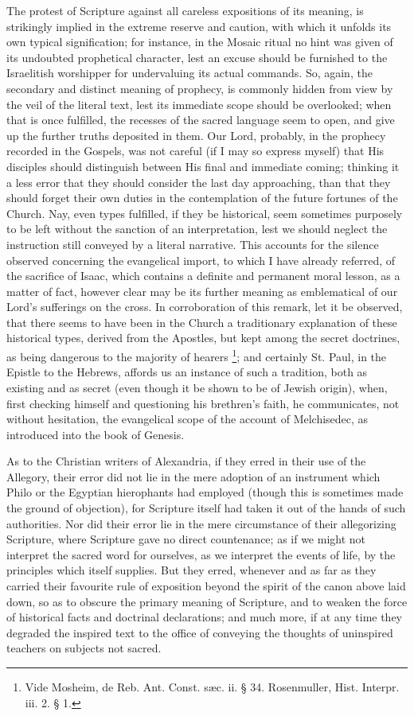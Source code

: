 The protest of Scripture against all careless expositions of its
meaning, is strikingly implied in the extreme reserve and caution,
with which it unfolds its own typical signification; for instance, in
the Mosaic ritual no hint was given of its undoubted prophetical
character, lest an excuse should be furnished to the Israelitish
worshipper for undervaluing its actual commands. So, again, the
secondary and distinct meaning of prophecy, is commonly hidden from
view by the veil of the literal text, lest its immediate scope should
be overlooked; when that is once fulfilled, the recesses of the sacred
language seem to open, and give up the further truths deposited in
them. Our Lord, probably, in the prophecy recorded in the Gospels, was
not careful (if I may so express myself) that His disciples should
distinguish between His final and immediate coming; thinking it a less
error that they should consider the last day approaching, than that
they should forget their own duties in the contemplation of the future
fortunes of the Church. Nay, even types fulfilled, if they be
historical, seem sometimes purposely to be left without the sanction
of an interpretation, lest we should neglect the instruction still
conveyed by a literal narrative. This accounts for the silence
observed concerning the evangelical import, to which I have already
referred, of the sacrifice of Isaac, which contains a definite and
permanent moral lesson, as a matter of fact, however clear may be its
further meaning as emblematical of our Lord's sufferings on the cross.
In corroboration of this remark, let it be observed, that there seems
to have been in the Church a traditionary explanation of these
historical types, derived from the Apostles, but kept among the secret
doctrines, as being dangerous to the majority of hearers \footnote{Vide Mosheim, de Reb. Ant. Const. sæc.
ii. § 34. Rosenmuller, Hist. Interpr. iii. 2. § 1.}; and certainly St. Paul, in the Epistle to the Hebrews,
affords us an instance of such a tradition, both as existing and as
secret (even though it be shown to be of Jewish origin), when, first
checking himself and questioning his brethren's faith, he
communicates, not without hesitation, the evangelical scope of the
account of Melchisedec, as introduced into the book of Genesis.

As to the Christian writers of Alexandria, if they erred in their
use of the Allegory, their error did not lie in the mere adoption of
an instrument which Philo or the Egyptian hierophants had employed
(though this is sometimes made the ground of objection), for Scripture
itself had taken it out of the hands of such authorities. Nor did
their error lie in the mere circumstance of their allegorizing
Scripture, where Scripture gave no direct countenance; as if we might
not interpret the sacred word for ourselves, as we interpret the
events of life, by the principles which itself supplies. But they
erred, whenever and as far as they carried their favourite rule of
exposition beyond the spirit of the canon above laid down, so as
to obscure the primary meaning of Scripture, and to weaken the force
of historical facts and doctrinal declarations; and much more, if at
any time they degraded the inspired text to the office of conveying
the thoughts of uninspired teachers on subjects not sacred.


